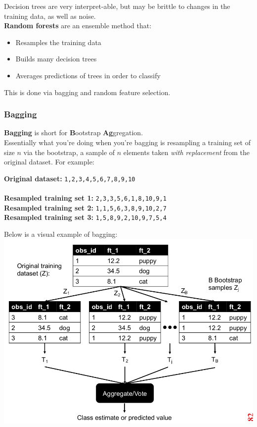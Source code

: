 \documentclass[english, 10pt]{article}
\begin{document}
Decision trees are very interpret-able, but may be brittle to changes in the training data, as well as noise.\\

\textbf{Random forests} are an ensemble method that:

\begin{itemize}
	\item Resamples the training data
	\item Builds many decision trees
	\item Averages predictions of trees in order to classify
\end{itemize}

This is done via bagging and random feature selection.

\subsubsection{Bagging}

\textbf{Bagging} is short for \textbf{B}ootstrap \textbf{Ag}gregation.\\

Essentially what you're doing when you're bagging is resampling a training set of size $n$ via the bootstrap, a sample of $n$ elements taken \textit{with replacement} from the original dataset. For example:\\

\begin{myproof}
\textbf{Original dataset:} \texttt{1,2,3,4,5,6,7,8,9,10}\\\\

\textbf{Resampled training set 1:} \texttt{2,3,3,5,6,1,8,10,9,1}\\
\textbf{Resampled training set 2:} \texttt{1,1,5,6,3,8,9,10,2,7}\\
\textbf{Resampled training set 3:} \texttt{1,5,8,9,2,10,9,7,5,4}
\end{myproof}

\hfill \break Below is a visual example of bagging:\\

{
\centering
\includegraphics[scale=0.5]{img/bagging.png} 
}
\end{document}
